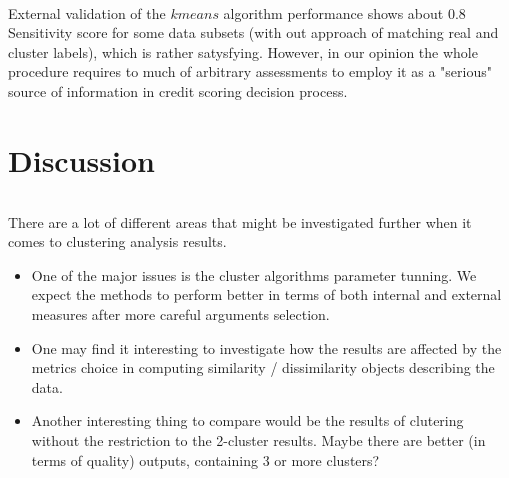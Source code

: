 \documentclass[10pt]{article}\usepackage[]{graphicx}\usepackage[]{color}
\begin{document}
\paragraph{}
External validation of the $kmeans$ algorithm performance shows about 0.8 
Sensitivity score for some data subsets (with out approach of matching
real and cluster labels), which is rather satysfying.  
However, in our opinion the whole procedure requires to much of arbitrary 
assessments to employ it as a "serious" source of information in 
credit scoring decision process. 





\clearpage
\part{Discussion}

\paragraph{} 
There are a lot of different areas that might be investigated further when it comes
to clustering analysis results. 
\begin{itemize}
\item One of the major issues is the cluster algorithms parameter 
tunning. We expect the methods to perform better in terms of both internal and external 
measures after more careful arguments selection.
\item One may find it interesting to investigate how the results are affected by the
metrics choice in computing similarity / dissimilarity objects describing the data.
\item Another interesting thing to compare would be the results of clutering 
without the restriction to the 2-cluster results. Maybe there are better (in terms
of quality) outputs, containing 3 or more clusters? 
\end{itemize}
\end{document}
